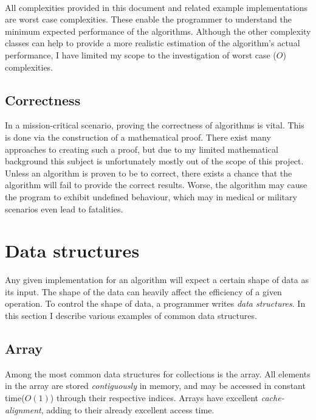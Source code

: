 \documentclass{article}
\begin{document}
\paragraph{}
All complexities provided in this document and related example implementations are worst case complexities. These enable
the programmer to understand the minimum expected performance of the algorithms. Although the other complexity classes
can help to provide a more realistic estimation of the algorithm's actual performance, I have limited my scope to the
investigation of worst case (\(O\)) complexities.

\subsection{Correctness}
In a mission-critical scenario, proving the correctness of algorithms is vital. This is done via the construction of a
mathematical proof. There exist many approaches to creating such a proof, but due to my limited mathematical background
this subject is unfortunately mostly out of the scope of this project. Unless an algorithm is proven to be to correct,
there exists a chance that the algorithm will fail to provide the correct results. Worse, the algorithm may cause the
program to exhibit undefined behaviour, which may in medical or military scenarios even lead to fatalities.


\newpage


\section{Data structures}
Any given implementation for an algorithm will expect a certain shape of data as its input. The shape of the data
can heavily affect the efficiency of a given operation. To control the shape of data, a programmer writes {\em data
structures}. In this section I describe various examples of common data structures.


\subsection{Array}
Among the most common data structures for collections is the array. All elements in the array are stored
{\em contiguously} in memory, and may be accessed in constant time(\(O(1)\)) through their respective indices.
Arrays have excellent {\em cache-alignment}, adding to their already excellent access time.
\end{document}
